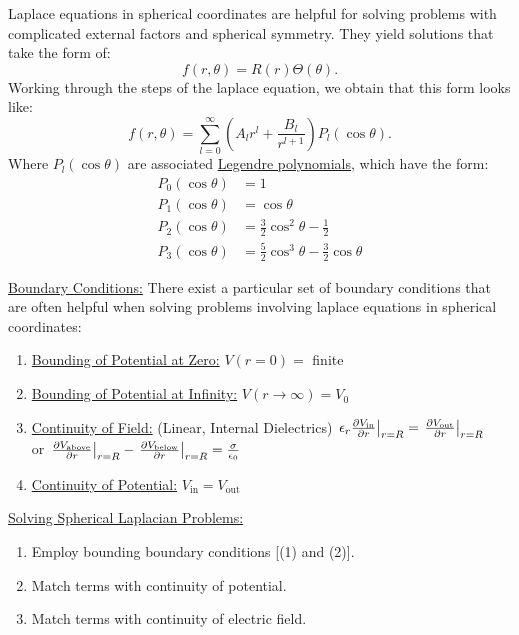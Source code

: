 \documentclass{article}
\newcommand{\sheader}[1]{\underline{#1:}}
\begin{document}
Laplace equations in spherical coordinates are helpful for solving problems with complicated
external factors and spherical symmetry. They yield solutions that take the form of:
\[
    f(r, \theta) = R(r) \Theta(\theta).
\]
Working through the steps of the laplace equation, we obtain that this form looks like:
\[
    f(r, \theta) = \sum_{l = 0}^\infty{\left(A_l r^l + \frac{B_l}{r^{l + 1}}\right)P_l(\cos \theta)}.    
\]
Where $P_l(\cos \theta)$ are associated \underline{Legendre polynomials}, which have the form:
\begin{align*}
    P_0(\cos \theta) &= 1\\
    P_1(\cos \theta) &= \cos\theta \\
    P_2(\cos \theta) &= \frac{3}{2} \cos^2 \theta - \frac{1}{2}\\
    P_3(\cos \theta) &= \frac{5}{2} \cos^3 \theta - \frac{3}{2} \cos \theta
\end{align*}

\sheader{Boundary Conditions} There exist a particular set of boundary conditions that are 
often helpful when solving problems involving laplace equations in spherical coordinates:
\begin{enumerate}
    \item \sheader{Bounding of Potential at Zero} $V(r = 0) = $ finite
    \item \sheader{Bounding of Potential at Infinity} $V(r \to \infty) = V_0$
    \item \sheader{Continuity of Field} (Linear, Internal Dielectrics) 
    $\eval{\epsilon_r \frac{\partial V_\textrm{in}}{\partial r}}_{r = R} = \eval{\frac{\partial V_\textrm{out}}{\partial r}}_{r = R}$\\
    or $\eval{\frac{\partial V_\textrm{above}}{\partial r}}_{r = R} - \eval{\frac{\partial V_\textrm{below}}{\partial r}}_{r = R} = \frac{\sigma}{\epsilon_0}$
    \item \sheader{Continuity of Potential} $V_\textrm{in} = V_\textrm{out}$
\end{enumerate}

\sheader{Solving Spherical Laplacian Problems}
\begin{enumerate}
    \item Employ bounding boundary conditions [(1) and (2)].
    \item Match terms with continuity of potential.
    \item Match terms with continuity of electric field.
\end{enumerate}
\end{document}
